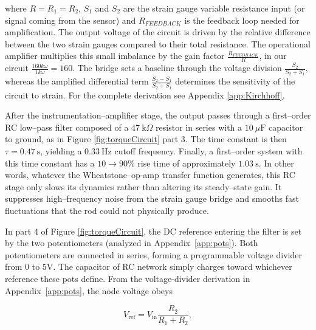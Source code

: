 \noindent where $R = R_1 = R_2$, $S_1$ and $S_2$ are the strain gauge variable resistance input (or signal coming from the sensor) and $R_{FEEDBACK}$ is the feedback loop needed for amplification. The output voltage of the circuit is driven by the relative difference between the two strain gauges compared to their total resistance. The operational amplifier multiplies this small imbalance by the gain factor $\frac{R_{FEEDBACK}}{R}$, in our circuit $\frac{160k\omega}{1k\omega} = 160$. The bridge sets a baseline through the voltage division
$
\frac{S_2}{S_2 + S_1},
$
whereas the amplified differential term
$
\frac{S_2 - S_1}{S_2 + S_1}
$
determines the sensitivity of the circuit to strain. For the complete derivation see Appendix \ref{app:Kirchhoff}.


After the instrumentation–amplifier stage, the output passes through a first–order RC low–pass filter composed of a \(47~\text{k}\Omega\) resistor in series with a \(10~\mu\text{F}\) capacitor to ground, as in Figure \ref{fig:torqueCircuit} part 3. The time constant is then $\tau= 0.47~\text{s}$, yielding a $0.33~\text{Hz}$ cutoff frequency. Finally, a first–order system with this time constant has a \(10\rightarrow 90\%\) rise time of approximately $1.03~\text{s}$. In other words, whatever the Wheatstone–op-amp transfer function generates, this RC stage only slows its dynamics rather than altering its steady–state gain. It suppresses high–frequency noise from the strain gauge bridge and smooths fast fluctuations that the rod could not physically produce.


In part 4 of Figure \ref{fig:torqueCircuit}, the DC reference entering the filter is set by the two potentiometers (analyzed in Appendix~\ref{app:pots}).
Both potentiometers are connected in series, forming a programmable voltage divider from 0 to 5V. The capacitor of RC network simply charges toward whichever reference these pots define. From the voltage-divider derivation in Appendix~\ref{app:pots}, the node voltage obeys

\begin{equation}
	\label{eq:voltageDivider}
	V_{\text{ref}} =
	V_{\text{in}}
	\frac{R_{2}}{R_{1}+R_{2}},
\end{equation}


